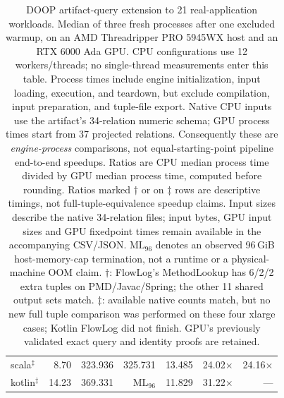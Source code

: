 \begin{table}[t]
{\begin{tabular}{lrrrrrr}
scala$^{\ddagger}$ & 8.70 & 323.936 & 325.731 & 13.485 & 24.02$\times$ & 24.16$\times$ \\
kotlin$^{\ddagger}$ & 14.23 & 369.331 & $\mathrm{ML}_{96}$ & 11.829 & 31.22$\times$ & --- \\
\bottomrule
\end{tabular}}
\caption{DOOP artifact-query extension to 21 real-application workloads.
Median of three fresh processes after one excluded warmup, on an AMD Threadripper
PRO 5945WX host and an RTX 6000 Ada GPU. CPU configurations use 12 workers/threads;
no single-thread measurements enter this table. Process times include engine
initialization, input loading, execution, and teardown, but exclude compilation,
input preparation, and tuple-file export. Native CPU inputs use the artifact's
34-relation numeric schema; GPU process times start from 37 projected relations.
Consequently these are \emph{engine-process} comparisons, not equal-starting-point
pipeline end-to-end speedups. Ratios are CPU median process time divided by GPU
median process time, computed before rounding. Ratios marked $\dagger$ or on
$\ddagger$ rows are descriptive timings, not full-tuple-equivalence speedup claims.
Input sizes describe the native 34-relation files; input bytes, GPU input sizes
and GPU fixedpoint times remain available in the accompanying CSV/JSON.
$\mathrm{ML}_{96}$ denotes an observed 96\,GiB host-memory-cap termination, not a
runtime or a physical-machine OOM claim. $\dagger$: FlowLog's MethodLookup has
6/2/2 extra tuples on PMD/Javac/Spring; the other 11 shared output sets match.
$\ddagger$: available native counts match, but no new full tuple comparison was
performed on these four xlarge cases; Kotlin FlowLog did not finish.
GPU's previously validated exact query and identity proofs are retained.}
\label{tab:doop-native-process}
\end{table}
